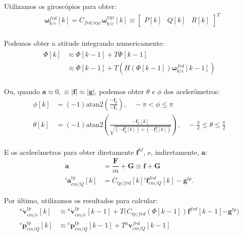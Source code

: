 Utilizamos os giroscópios para obter:
\begin{align*}
     &\mathbf{\omega}^{frd}_{b/e}{\left[k\right]}
     = C_{frd/xyz} \mathbf{\omega}^{xyz}_{b/e}{\left[k\right]}
        \equiv \begin{bmatrix} P{\left[k\right]} & Q{\left[k\right]} & R{\left[k\right]} \end{bmatrix}^{T}
        \text{} \\
\end{align*}

Podemos obter a atitude integrando numericamente:
\begin{align*}
{\Phi}{\left[ k \right]} 
    &\approx {\Phi} {\left[ k-1 \right]} + T {\dot{\Phi}{\left[ k -1 \right]}} \\
    &\approx {\Phi} {\left[ k-1 \right]} + T {\left( H {\left( \Phi{\left[ k-1 \right]} \right)}{\mathbf{\omega}^{frd}_{b/e}}{\left[ k-1 \right]}\right)} \\
\end{align*}

Ou, quando \(\mathbf{a} \approx 0, \equiv \lvert\mathbf{f}\lvert \approx \lvert\mathbf{g}\lvert\), podemos obter \(\theta\) e \(\phi\) dos acelerômetros:
\begin{align*}
    {\phi}\left[k\right] &= \left(-1\right)  \textrm{atan2}\left(\frac{\mathbf{-f}_{y}}{\mathbf{-f}_{z}}\right),\quad
    -\pi  < \phi \leq \pi \\
    {{\theta}{\left[k\right]}} &= {\left(-1\right)}  \textrm{atan2} \left( {\frac{-\mathbf{f}_{x}\left[k\right] }{ \sqrt{ {\left({{-\mathbf{f}_{y}^{2}}\left[k\right]}\right)} + {\left({{-\mathbf{f}}_{z}^{2}}{\left[k\right]}\right)}}}} \right), \quad -\frac{\pi}{2} \leq \theta \leq \frac{\pi}{2} \\
\end{align*}

E os acelerômetros para obter diretamente \(\mathbf{f}^{bf}\), e, indiretamente, \(\mathbf{a}\):
\begin{align*}
    \mathbf{a} &= \dfrac{\mathbf{F}}{m} + \mathbf{G} \equiv \mathbf{f} + \mathbf{G} \\
{^{i}\mathbf{a}^{tp}_{cm/Q}\left[k\right]} &= C_{tp/frd}\left[k\right]{^{i}\mathbf{f}^{frd}_{cm/Q}\left[k\right]} - \mathbf{g}^{tp}.
\end{align*}

Por último, utilizamos os resultados para calcular:
\begin{align*}
    {^{a}{\dot{\mathbf{v}}}^{tp}_{cm/e}{\left[k\right]}}
        &\approx {^{a}{\dot{\mathbf{v}}}^{tp}_{cm/e}}{\left[ k-1 \right]}
        + T \Big( {C_{tp/frd}\left({\Phi}{\left[ k-1 \right]} \right)} {{\mathbf{f}}^{frd}\left[k-1\right]} {-{\mathbf{g}}^{tp}} \Big) \\
    {^{e}{\mathbf{p}^{tp}_{cm/Q}}\left[k\right]}
    &\approx     {^{e}{\mathbf{p}^{tp}_{cm/Q}}\left[k-1\right]}
    + T {^{a}\mathbf{v}^{frd}_{cm/Q}{\left[ k-1 \right]}} \\
\end{align*}

